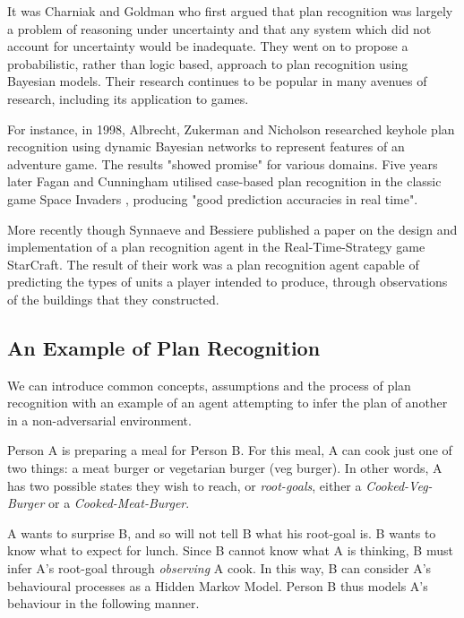 \documentclass[parskip]{cs4rep}
\begin{document}
It was Charniak and Goldman \cite{journals/ai/CharniakG93} who first argued that plan recognition was largely a problem of reasoning under uncertainty and that any system which did not account for uncertainty would be inadequate. They went on to propose a probabilistic, rather than logic based, approach to plan recognition using Bayesian models. Their research continues to be popular in many avenues of research, including its application to games.

For instance, in 1998, Albrecht, Zukerman and Nicholson \cite{Albrecht:1998:BMK:598277.598308} researched keyhole plan recognition using dynamic Bayesian networks to represent features of an adventure game. The results "showed promise" for various domains. Five years later Fagan and Cunningham utilised case-based plan recognition in the classic game Space Invaders \cite{Fagan03case-basedplan}, producing "good prediction accuracies in real time".

More recently though Synnaeve and Bessiere \cite{conf/aiide/SynnaeveB11} published a paper on the design and implementation of a plan recognition agent in the Real-Time-Strategy game StarCraft. The result of their work was a plan recognition agent capable of predicting the types of units a player intended to produce, through observations of the buildings that they constructed.

\subsection{An Example of Plan Recognition}

We can introduce common concepts, assumptions and the process of plan recognition with an example of an agent attempting to infer the plan of another in a non-adversarial environment. 

Person A is preparing a meal for Person B. For this meal, A can cook just one of two things: a meat burger or vegetarian burger (veg burger). In other words, A has two possible states they wish to reach, or \textit{root-goals}, either a \textit{Cooked-Veg-Burger} or a \textit{Cooked-Meat-Burger}. 

A wants to surprise B, and so will not tell B what his root-goal is. B wants to know what to expect for lunch. Since B cannot know what A is thinking, B must infer A's root-goal through \textit{observing} A cook. In this way, B can consider A's behavioural processes as a Hidden Markov Model. Person B thus models A's behaviour in the following manner. 
\end{document}
